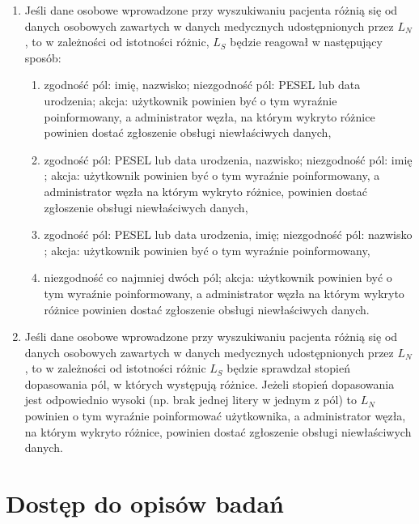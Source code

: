 \documentclass[a4paper]{report}
\begin{document}
\begin{enumerate}
  \item Jeśli dane osobowe wprowadzone przy wyszukiwaniu pacjenta różnią się od danych osobowych zawartych w danych medycznych udostępnionych przez $L_N$, to w zależności od istotności różnic, $L_S$ będzie reagował w następujący sposób:
   \begin{enumerate}
      \item zgodność pól: imię, nazwisko; niezgodność pól: PESEL lub data urodzenia; akcja: użytkownik powinien być o tym wyraźnie poinformowany, a administrator węzła, na którym wykryto różnice powinien dostać zgłoszenie obsługi niewłaściwych danych,
      \item zgodność pól: PESEL lub data urodzenia, nazwisko; niezgodność pól: imię ; akcja: użytkownik powinien być o tym wyraźnie poinformowany, a administrator węzła na którym wykryto różnice, powinien dostać zgłoszenie obsługi niewłaściwych danych,
      \item zgodność pól: PESEL lub data urodzenia, imię; niezgodność pól: nazwisko ; akcja: użytkownik powinien być o tym wyraźnie poinformowany,
      \item niezgodność co najmniej dwóch pól; akcja: użytkownik powinien być o tym wyraźnie poinformowany, a administrator węzła na którym wykryto różnice powinien dostać zgłoszenie obsługi niewłaściwych danych.
   \end{enumerate}
  \item Jeśli dane osobowe wprowadzone przy wyszukiwaniu pacjenta różnią się od danych osobowych zawartych w danych medycznych udostępnionych przez $L_N$, to w zależności od istotności różnic $L_S$ będzie sprawdzał stopień dopasowania pól, w których występują różnice. Jeżeli stopień dopasowania jest odpowiednio wysoki (np. brak jednej litery w jednym z pól) to $L_N$ powinien o tym wyraźnie poinformować użytkownika, a administrator węzła, na którym wykryto różnice, powinien dostać zgłoszenie obsługi niewłaściwych danych.
\end{enumerate}

\section{Dostęp do opisów badań}
\end{document}
